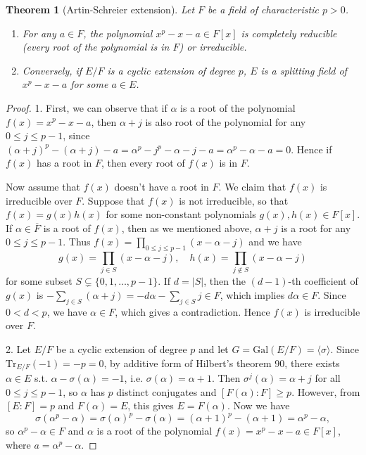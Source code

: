 \documentclass{article}
\newtheorem{theorem}{Theorem}
\newcommand{\Gal}{\mathrm{Gal}}
\newcommand{\Tr}{\mathrm{Tr}}
\begin{document}
\begin{theorem}[Artin-Schreier extension]
Let $F$ be a field of characteristic $p > 0$.
\begin{enumerate}
\item For any $a\in F$, the polynomial  $x^{p} - x - a\in F[x]$ is completely reducible (every root of the polynomial is in $F$) or irreducible. 
\item Conversely, if $E/F$ is a cyclic extension of degree $p$, $E$ is a splitting field of $x^{p} - x - a$ for some $a\in E$. 
\end{enumerate} 
\end{theorem}
\begin{proof}
1. First, we can observe that if $\alpha$ is a root of the polynomial $f(x) = x^{p} - x - a$, then $\alpha + j$ is also root of the polynomial for any $0\leq j\leq p-1$, since $(\alpha+j)^{p} - (\alpha + j)  - a= \alpha^{p} - j^{p} - \alpha - j - a= \alpha^{p} - \alpha - a = 0$. 
Hence if $f(x)$ has a root in $F$, then every root of $f(x)$ is in $F$. 

Now assume that $f(x)$ doesn't have a root in $F$. We claim that $f(x)$ is irreducible over $F$. 
Suppose that $f(x)$ is not irreducible, so that $f(x) = g(x) h(x)$ for some  non-constant polynomials $g(x), h(x)\in F[x]$. 
If $\alpha\in \overline{F}$ is a root of $f(x)$, then as we mentioned above, $\alpha + j$ is a root for any $0\leq j\leq p-1$. Thus $f(x) = \prod_{0\leq j\leq p-1} (x-\alpha - j)$ and we have
$$
g(x) = \prod_{j\in S}(x-\alpha-j), \quad h(x) = \prod_{j\not\in S} (x-\alpha - j)
$$
for some subset $S\subsetneq \{0, 1, \dots, p-1\}$. If $d = |S|$, then the $(d-1)$-th coefficient of $g(x)$ is $-\sum_{j\in S} (\alpha + j) = -d\alpha - \sum_{j\in S} j \in F$, which implies $d\alpha \in F$. Since $0<d<p$, we have $\alpha\in F$,  which gives a contradiction. 
Hence $f(x)$ is irreducible over $F$. 

2. Let $E/F$ be a cyclic extension of degree $p$ and let $G = \Gal(E/F) = \langle \sigma\rangle$. Since $\Tr_{E/F}(-1) = -p = 0$, by additive form of Hilbert's theorem 90,  there exists $\alpha\in E$ s.t. $\alpha - \sigma(\alpha) = -1$, i.e. $\sigma(\alpha) = \alpha + 1$. Then $\sigma^{j}(\alpha) = \alpha + j$ for all $0\leq j\leq p-1$, so $\alpha$ has $p$ distinct conjugates and $[F(\alpha):F]\geq p$. 
However, from $[E:F] = p$ and $F(\alpha) = E$, this gives $E = F(\alpha)$. Now we have
$$
\sigma(\alpha^{p} - \alpha) = \sigma(\alpha)^{p} - \sigma(\alpha) = (\alpha +1)^{p} - (\alpha + 1) = \alpha^{p} -\alpha, 
$$
so $\alpha^{p} -\alpha \in F$ and $\alpha$ is a root of the polynomial $f(x) = x^{p} - x - a\in F[x]$, where $a = \alpha^{p}- \alpha$. 
\end{proof}
\end{document}
